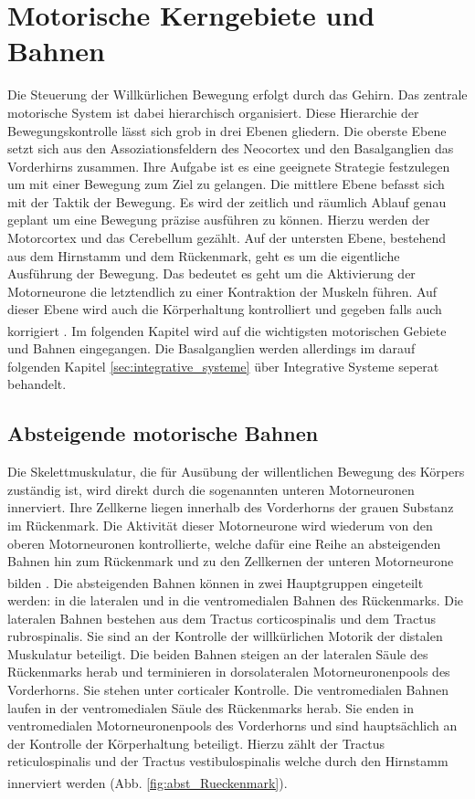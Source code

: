 \documentclass[12pt,a4paper,pdftex]{article}
\begin{document}
\newpage
\section{Motorische Kerngebiete und Bahnen}
Die Steuerung der Willkürlichen Bewegung erfolgt durch das Gehirn. Das zentrale motorische System ist dabei hierarchisch organisiert. Diese Hierarchie der Bewegungskontrolle lässt sich grob in drei Ebenen gliedern. Die oberste Ebene setzt sich aus den Assoziationsfeldern des Neocortex und den Basalganglien das Vorderhirns zusammen. Ihre Aufgabe ist es eine geeignete Strategie festzulegen um mit einer Bewegung zum Ziel zu gelangen. Die mittlere Ebene befasst sich mit der Taktik der Bewegung. Es wird der zeitlich und räumlich Ablauf genau geplant um eine Bewegung präzise ausführen zu können. Hierzu werden der Motorcortex und das Cerebellum gezählt. Auf der untersten Ebene, bestehend aus dem Hirnstamm und dem Rückenmark, geht es um die eigentliche Ausführung der Bewegung. Das bedeutet es geht um die Aktivierung der Motorneurone die letztendlich zu einer Kontraktion der Muskeln führen. Auf dieser Ebene wird auch die Körperhaltung kontrolliert und gegeben falls auch korrigiert \textsuperscript{\cite[14]{neurowissenschaften_baer}}. Im folgenden Kapitel wird auf die wichtigsten motorischen Gebiete und Bahnen eingegangen. Die Basalganglien werden allerdings im darauf folgenden Kapitel \ref{sec:integrative_systeme} über Integrative Systeme seperat behandelt.       

\subsection{Absteigende motorische Bahnen}
Die Skelettmuskulatur, die für Ausübung der willentlichen Bewegung des Körpers zuständig ist, wird direkt durch die sogenannten unteren Motorneuronen innerviert. Ihre Zellkerne liegen innerhalb des Vorderhorns der grauen Substanz im Rückenmark. Die Aktivität dieser Motorneurone wird wiederum von den oberen Motorneuronen kontrollierte, welche dafür eine Reihe an absteigenden Bahnen hin zum Rückenmark und zu den Zellkernen der unteren Motorneurone bilden \textsuperscript{\cite[1]{crossman2014neuroanatomy}}. Die absteigenden Bahnen können in zwei Hauptgruppen eingeteilt werden: in die lateralen und in die ventromedialen Bahnen des Rückenmarks. Die lateralen Bahnen bestehen aus dem Tractus corticospinalis und dem Tractus rubrospinalis. Sie sind an der Kontrolle der willkürlichen Motorik der distalen Muskulatur beteiligt. Die beiden Bahnen steigen an der lateralen Säule des Rückenmarks herab und terminieren in dorsolateralen Motorneuronenpools des Vorderhorns. Sie stehen unter corticaler Kontrolle. Die ventromedialen Bahnen laufen in der ventromedialen Säule des Rückenmarks herab. Sie enden in ventromedialen Motorneuronenpools des Vorderhorns und sind hauptsächlich an der Kontrolle der Körperhaltung beteiligt. Hierzu zählt der Tractus reticulospinalis und der Tractus vestibulospinalis welche durch den Hirnstamm innerviert werden \textsuperscript{\cite[14]{neurowissenschaften_baer}} (Abb. \ref{fig:abst_Rueckenmark}). 
\end{document}
